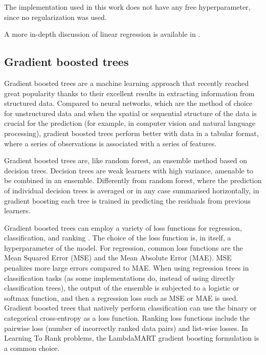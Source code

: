 The implementation used in this work does not have any free hyperparameter, since no regularization was used.

A more in-depth discussion of linear regression is available in \textcite{Yan2009}.

\subsection{Gradient boosted trees}
Gradient boosted trees \parencite{Freund1997,Friedman2000,Friedman2001} are a machine learning approach that recently reached great popularity thanks to their excellent results in extracting information from structured data.
Compared to neural networks, which are the method of choice for unstructured data and when the spatial or sequential structure of the data is crucial for the prediction (for example, in computer vision and natural language processing), gradient boosted trees perform better with data in a tabular format, where a series of observations is associated with a series of features.

Gradient boosted trees are, like random forest, an ensemble method based on decision trees.
Decision trees are weak learners with high variance, amenable to be combined in an ensemble.
Differently from random forest, where the prediction of individual decision trees is averaged or in any case summarised horizontally, in gradient boosting each tree is trained in predicting the residuals from previous learners.

Gradient boosted trees can employ a variety of loss functions for regression, classification, and ranking \parencite[reviewed in][]{Natekin2013}.
The choice of the loss function is, in itself, a hyperparameter of the model.
For regression, common loss functions are the Mean Squared Error (MSE) and the Mean Absolute Error (MAE).
MSE penalizes more large errors compared to MAE\@.
When using regression trees in classification tasks (as some implementations do, instead of using directly classification trees), the output of the ensemble is subjected to a logistic or softmax function, and then a regression loss such as MSE or MAE is used.
Gradient boosted trees that natively perform classification can use the binary or categorical cross-entropy as a loss function.
Ranking loss functions include the pairwise loss (number of incorrectly ranked data pairs) and list-wise losses.
In Learning To Rank problems, the LambdaMART \parencite{Burges2010} gradient boosting formulation is a common choice.


